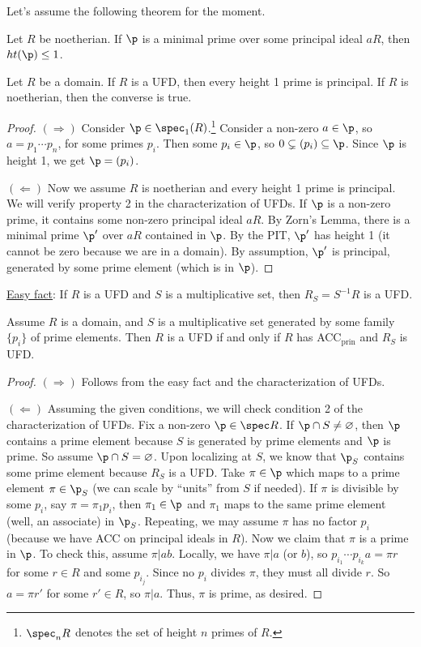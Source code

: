  Let's assume the following theorem for the moment.
 \begin{theorem}
   Let $R$ be noetherian. If $\p$ is a minimal prime over some principal ideal $aR$, then
   $ht(\p)\le 1$.
 \end{theorem}
 \begin{theorem}
   Let $R$ be a domain. If $R$ is a UFD, then every height 1 prime is principal. If $R$
   is noetherian, then the converse is true.
 \end{theorem}
 \begin{proof}
   $(\Rightarrow)$ Consider $\p\in \spec_1(R)$.\footnote{$\spec_n R$ denotes the set of
   height $n$ primes of $R$.} Consider a non-zero $a\in \p$, so $a=p_1\cdots p_n$, for
   some primes $p_i$. Then some $p_i\in \p$, so $0\subsetneq(p_i)\subseteq \p$. Since
   $\p$ is height 1, we get $\p=(p_i)$.

   $(\Leftarrow)$ Now we assume $R$ is noetherian and every height 1 prime is principal.
   We will verify property 2 in the characterization of UFDs. If $\p$ is a non-zero
   prime, it contains some non-zero principal ideal $aR$. By Zorn's Lemma, there is a
   minimal prime $\p'$ over $aR$ contained in $\p$. By the PIT, $\p'$ has height 1 (it
   cannot be zero because we are in a domain). By assumption, $\p'$ is principal,
   generated by some prime element (which is in $\p$).
 \end{proof}
 \noindent\underline{Easy fact}: If $R$ is a UFD and $S$ is a multiplicative set, then
 $R_S=S^{-1}R$ is a UFD.
 \begin{theorem}[Nagata]
   Assume $R$ is a domain, and $S$ is a multiplicative set generated by some family
   $\{p_i\}$ of prime elements. Then $R$ is a UFD if and only if $R$ has
   ACC$_\text{prin}$ and $R_S$ is UFD.
 \end{theorem}
 \begin{proof}
   $(\Rightarrow)$ Follows from the easy fact and the characterization of UFDs.

   $(\Leftarrow)$ Assuming the given conditions, we will check condition 2 of the
   characterization of UFDs. Fix a non-zero $\p\in \spec R$. If $\p\cap
   S\neq\varnothing$, then $\p$ contains a prime element because $S$ is generated by
   prime elements and $\p$ is prime. So assume $\p\cap S=\varnothing$. Upon localizing at
   $S$, we know that $\p_S$ contains some prime element because $R_S$ is a UFD. Take
   $\pi\in \p$ which maps to a prime element $\pi\in \p_S$ (we can scale by ``units''
   from $S$ if needed). If $\pi$ is divisible by some $p_i$, say $\pi=\pi_1 p_i$, then
   $\pi_1\in \p$ and $\pi_1$ maps to the same prime element (well, an associate) in
   $\p_S$. Repeating, we may assume $\pi$ has no factor $p_i$ (because we have ACC on
   principal ideals in $R$). Now we claim that $\pi$ is a prime in $\p$. To check this,
   assume $\pi|ab$. Locally, we have $\pi|a$ (or $b$), so $p_{i_1}\cdots p_{i_k}a = \pi
   r$ for some $r\in R$ and some $p_{i_j}$. Since no $p_i$ divides $\pi$, they must all
   divide $r$. So $a=\pi r'$ for some $r'\in R$, so $\pi|a$. Thus, $\pi$ is prime, as
   desired.
 \end{proof}

